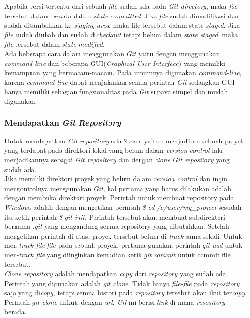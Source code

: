 Apabila versi tertentu dari sebuah \textit{file} sudah ada pada \textit{Git directory}, maka \textit{file} tersebut dalam berada dalam \textit{state committed}. Jika \textit{file} sudah dimodifikasi dan sudah ditambahkan ke \textit{staging area}, maka file tersebut dalam state \textit{staged}. Jika \textit{file} sudah diubah dan sudah di\textit{checkout} tetapi belum dalam \textit{state staged}, maka \textit{file} tersebut dalam \textit{state modified}.\\

Ada beberapa cara dalam menggunakan \textit{Git} yaitu dengan menggunakan \textit{command-line} dan beberapa GUI(\textit{Graphical User Interface}) yang memiliki kemampuan yang bermacam-macam. Pada umumnya digunakan \textit{command-line}, karena \textit{command-line} dapat menjalankan semua perintah \textit{Git} sedangkan GUI hanya memiliki sebagian fungsionalitas pada \textit{Git} supaya simpel dan mudah digunakan. 

\subsubsection{Mendapatkan \textit{Git Repository}}
Untuk mendapatkan \textit{Git repository} ada 2 cara yaitu : menjadikan sebuah proyek yang terdapat pada direktori lokal yang belum dalam \textit{version control} lalu menjadikannya sebagai \textit{Git repository} dan dengan \textit{clone Git repository} yang sudah ada.\\

Jika memiliki direktori proyek yang belum dalam \textit{version control} dan ingin mengontrolnya menggunakan \textit{Git}, hal pertama yang harus dilakukan adalah dengan membuka direktori proyek. Perintah untuk membuat repository pada \textit{Windows} adalah dengan mengetikan perintah \textit{\$ cd /c/user/my\_project} sesudah itu ketik perintah \textit{\$ git init}. Perintah tersebut akan membuat subdirektori bernama \textit{.git} yang mengandung semua repository yang dibutuhkan. Setelah mengetikan perintah di atas, proyek tersebut belum di-\textit{track} sama sekali. Untuk men-\textit{track file-file} pada sebuah proyek, pertama gunakan perintah \textit{git add} untuk men-\textit{track file} yang diinginkan kemudian ketik \textit{git commit} untuk commit file tersebut.\\

\textit{Clone repository} adalah mendapatkan \textit{copy} dari \textit{repository} yang sudah ada. Perintah yang digunakan adalah \textit{git clone}. Tidak hanya \textit{file-file} pada \textit{repository} saja yang di\textit{copy}, tetapi semua histori pada \textit{repository} tersebut akan ikut ter\textit{copy}. Perintah \textit{git clone} diikuti dengan \textit{url}. \textit{Url} ini berisi \textit{link} di mana \textit{repository} berada.

